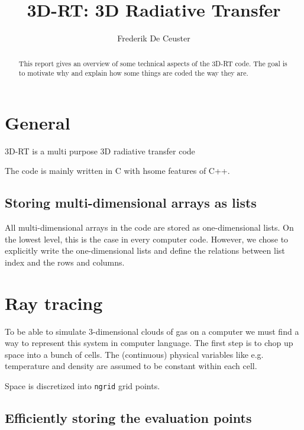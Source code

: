 \documentclass[]{article}
\title{\vspace{0cm} \huge 3D-RT: 3D Radiative Transfer}
\author{\large Frederik De Ceuster}
\date{}
\begin{document}
\maketitle

\vskip5cm

\begin{abstract}
This report gives an overview of some technical aspects of the 3D-RT code. The goal is to motivate why and explain how some things are coded the way they are.
\end{abstract}

\vskip5cm

\tableofcontents

\newpage


\section{General}

3D-RT is a multi purpose 3D radiative transfer code

The code is mainly written in C with hsome features of C++.

\subsection{Storing multi-dimensional arrays as lists}

All multi-dimensional arrays in the code are stored as one-dimensional lists. On the lowest level, this is the case in every computer code. However, we chose to explicitly write the one-dimensional lists and define the relations between list index and the rows and columns.

\section{Ray tracing}

To be able to simulate 3-dimensional clouds of gas on a computer we must find a way to represent this system in computer language. The first step is to chop up space into a bunch of cells. The (continuous) physical variables like e.g. temperature and density are assumed to be constant within each cell.

\bigskip

Space is discretized into \texttt{ngrid} grid points.

\subsection{Efficiently storing the evaluation points}
\end{document}
